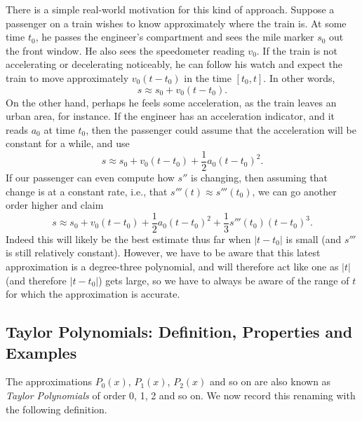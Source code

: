 There is a simple real-world motivation for this kind of approach.
Suppose a passenger on a train wishes to know  
approximately where the train is.  At some time $t_0$, 
he passes the engineer's compartment and sees the 
mile marker  $s_0$ out the front window.  He
also sees the speedometer reading $v_0$.
If the train is not accelerating or decelerating 
noticeably, he can follow his watch and 
expect the train to move approximately $v_0(t-t_0)$
in the time $[t_0,t]$.  In other words,
\begin{equation}s\approx s_0+v_0(t-t_0).\end{equation}
On the other hand, perhaps he feels some acceleration,
as the train leaves an urban area, for instance.
If the engineer has an acceleration indicator,
and it reads $a_0$ at time $t_0$, then the passenger
could assume that the acceleration will be constant
for a while, and use
\begin{equation}s\approx s_0+v_0(t-t_0)+\frac12a_0(t-t_0)^2.
\label{2nd-OrderApproxOfPosition}\end{equation}
If our passenger can even compute 
how $s''$ is changing, then assuming that change is at a constant rate,
i.e., that $s'''(t)\approx s'''(t_0)$, we can go another 
order higher and claim\footnotemark
\begin{equation}
s\approx s_0+v_0(t-t_0)+\frac12a_0(t-t_0)^2+\frac13s'''(t_0)(t-t_0)^3.
\label{3rd-OrderApproxOfPosition}\end{equation}
Indeed this will likely be the best estimate thus far when $|t-t_0|$ is 
small (and $s'''$ is still relatively constant).
However, we have to be aware that this latest approximation
is a degree-three polynomial,
and will therefore act like one as $|t|$ (and therefore $|t-t_0|$)
gets large, so we have
to always be aware of the range of $t$ for which the approximation
is accurate.




\newpage
\subsection{Taylor Polynomials:  Definition, Properties and Examples
\label{DefAndExamplesOfTaylorPolynomials}}
The approximations $P_0(x)$, $P_1(x)$, $P_2(x)$ and so on are also
known as {\it Taylor Polynomials} of order 0, 1, 2 and so on.
We now record this renaming with the following  definition.


